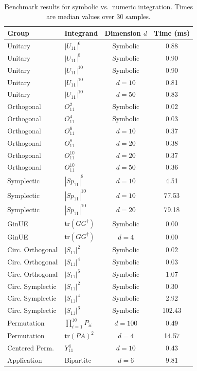 \documentclass[manuscript,screen]{acmart}
\begin{document}
\begin{table}[ht]
\centering
\caption{Benchmark results for symbolic vs.\ numeric integration. Times are
median values over 30 samples.}
\label{tab:benchmarks}
\begin{tabular}{llcc}
\hline
Group & Integrand & Dimension $d$ & Time (ms) \\
\hline
Unitary & $|U_{11}|^6$ & Symbolic & 0.88 \\
Unitary & $|U_{11}|^8$ & Symbolic & 0.90 \\
Unitary & $|U_{11}|^{10}$ & Symbolic & 0.90 \\
Unitary & $|U_{11}|^{10}$ & $d=10$ & 0.81 \\
Unitary & $|U_{11}|^{10}$ & $d=50$ & 0.83 \\
\hline
Orthogonal & $O_{11}^2$ & Symbolic & 0.02 \\
Orthogonal & $O_{11}^4$ & Symbolic & 0.03 \\
Orthogonal & $O_{11}^6$ & $d=10$ & 0.37 \\
Orthogonal & $O_{11}^8$ & $d=20$ & 0.38 \\
Orthogonal & $O_{11}^{10}$ & $d=20$ & 0.37 \\
Orthogonal & $O_{11}^{10}$ & $d=50$ & 0.36 \\
\hline
Symplectic & $|Sp_{11}|^8$ & $d=10$ & 4.51 \\
Symplectic & $|Sp_{11}|^{10}$ & $d=10$ & 77.53 \\
Symplectic & $|Sp_{11}|^{10}$ & $d=20$ & 79.18 \\
\hline
GinUE & $\mathrm{tr}(GG^\dagger)$ & Symbolic & 0.00 \\
GinUE & $\mathrm{tr}(GG^\dagger)$ & $d=4$ & 0.00 \\
\hline
Circ. Orthogonal & $|S_{11}|^2$ & Symbolic & 0.02 \\
Circ. Orthogonal & $|S_{11}|^4$ & Symbolic & 0.03 \\
Circ. Orthogonal & $|S_{11}|^6$ & Symbolic & 1.07 \\
Circ. Symplectic & $|S_{11}|^2$ & Symbolic & 0.30 \\
Circ. Symplectic & $|S_{11}|^4$ & Symbolic & 2.92 \\
Circ. Symplectic & $|S_{11}|^6$ & Symbolic & 102.43 \\
\hline
Permutation & $\prod_{i=1}^{10} P_{ii}$ & $d=100$ & 0.49 \\
Permutation & $\mathrm{tr}(PA)^2$ & $d=4$ & 14.57 \\
Centered Perm. & $Y_{11}^4$ & $d=10$ & 0.43 \\
\hline
Application & Bipartite & $d=6$ & 9.81 \\
\hline
\end{tabular}
\end{table}
\end{document}
